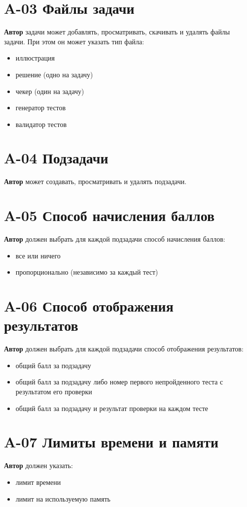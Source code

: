 \documentclass{book}
\begin{document}
\newpage \section*{A-03 Файлы задачи}
\textbf{Автор} задачи может добавлять, просматривать, скачивать и удалять файлы задачи.
При этом он может указать тип файла:
\begin{itemize}\setlength{\itemsep}{0pt}
	\item иллюстрация
	\item решение (одно на задачу)
	\item чекер (один на задачу)
	\item генератор тестов
	\item валидатор тестов
\end{itemize}

\newpage \section*{A-04 Подзадачи}
\textbf{Автор} может создавать, просматривать и удалять подзадачи. 

\newpage \section*{A-05 Способ начисления баллов}
\textbf{Автор} должен выбрать для каждой подзадачи способ начисления баллов:
\begin{itemize}\setlength{\itemsep}{0pt}
	\item все или ничего
	\item пропорционально (независимо за каждый тест)
\end{itemize}

\newpage \section*{A-06 Способ отображения результатов}
\textbf{Автор} должен выбрать для каждой подзадачи способ отображения результатов:
\begin{itemize}\setlength{\itemsep}{0pt}
	\item общий балл за подзадачу
	\item общий балл за подзадачу либо номер первого непройденного теста с результатом его проверки
	\item общий балл за подзадачу и результат проверки на каждом тесте
\end{itemize}

\newpage \section*{A-07 Лимиты времени и памяти}
\textbf{Автор} должен указать:
\begin{itemize}\setlength{\itemsep}{0pt}
	\item лимит времени
	\item лимит на используемую память
\end{itemize}
\end{document}
